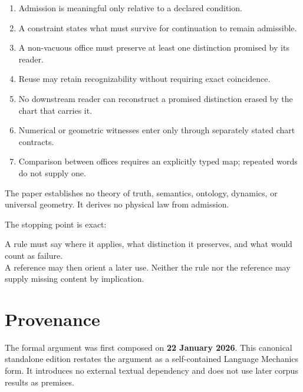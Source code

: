 \documentclass[11pt]{article}
\begin{document}
\begin{enumerate}
\item Admission is meaningful only relative to a declared condition.
\item A constraint states what must survive for continuation to remain admissible.
\item A non-vacuous office must preserve at least one distinction promised by its reader.
\item Reuse may retain recognizability without requiring exact coincidence.
\item No downstream reader can reconstruct a promised distinction erased by the chart that carries it.
\item Numerical or geometric witnesses enter only through separately stated chart contracts.
\item Comparison between offices requires an explicitly typed map; repeated words do not supply one.
\end{enumerate}

The paper establishes no theory of truth, semantics, ontology, dynamics, or universal geometry. It derives no physical law from admission.

The stopping point is exact:

\begin{lawbox}
\centering
A rule must say where it applies, what distinction it preserves, and what would count as failure.\\[3pt]
A reference may then orient a later use. Neither the rule nor the reference may supply missing content by implication.
\end{lawbox}

\section*{Provenance}

The formal argument was first composed on \textbf{22 January 2026}. This canonical standalone edition restates the argument as a self-contained Language Mechanics form. It introduces no external textual dependency and does not use later corpus results as premises.
\end{document}
